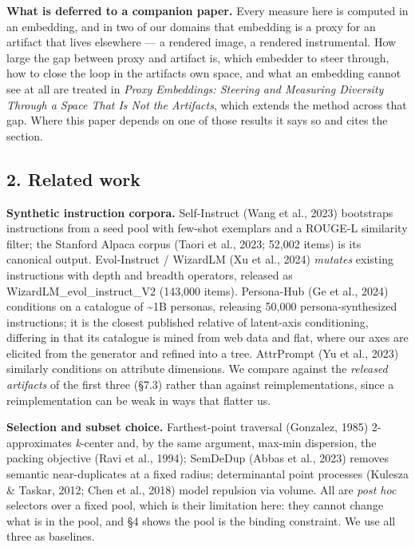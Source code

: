 \documentclass[
  10pt,
]{article}
\theoremstyle{plain}
\theoremstyle{definition}
\begin{document}
\textbf{What is deferred to a companion paper.} Every measure here is
computed in an embedding, and in two of our domains that embedding is a
proxy for an artifact that lives elsewhere --- a rendered image, a
rendered instrumental. How large the gap between proxy and artifact is,
which embedder to steer through, how to close the loop in the
artifact\textquotesingle s own space, and what an embedding cannot see
at all are treated in \emph{Proxy Embeddings: Steering and Measuring
Diversity Through a Space That Is Not the Artifact\textquotesingle s},
which extends the method across that gap. Where this paper depends on
one of those results it says so and cites the section.

\subsection{2. Related work}\label{2-related-work}

\textbf{Synthetic instruction corpora.} Self-Instruct (Wang et al.,
2023) bootstraps instructions from a seed pool with few-shot exemplars
and a ROUGE-L similarity filter; the Stanford Alpaca corpus (Taori et
al., 2023; 52,002 items) is its canonical output. Evol-Instruct /
WizardLM (Xu et al., 2024) \emph{mutates} existing instructions with
depth and breadth operators, released as WizardLM\_evol\_instruct\_V2
(143,000 items). Persona-Hub (Ge et al., 2024) conditions on a catalogue
of \textasciitilde1B personas, releasing 50,000 persona-synthesized
instructions; it is the closest published relative of latent-axis
conditioning, differing in that its catalogue is mined from web data and
flat, where our axes are elicited from the generator and refined into a
tree. AttrPrompt (Yu et al., 2023) similarly conditions on attribute
dimensions. We compare against the \emph{released artifacts} of the
first three (§7.3) rather than against reimplementations, since a
reimplementation can be weak in ways that flatter us.

\textbf{Selection and subset choice.} Farthest-point traversal
(Gonzalez, 1985) 2-approximates \emph{k}-center and, by the same
argument, max-min dispersion, the packing objective (Ravi et al., 1994);
SemDeDup (Abbas et al., 2023) removes semantic near-duplicates at a
fixed radius; determinantal point processes (Kulesza \& Taskar, 2012;
Chen et al., 2018) model repulsion via volume. All are \emph{post hoc}
selectors over a fixed pool, which is their limitation here: they cannot
change what is in the pool, and §4 shows the pool is the binding
constraint. We use all three as baselines.
\end{document}
